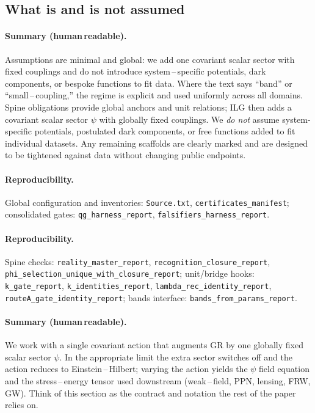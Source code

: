 \documentclass[aps,prd,twocolumn,superscriptaddress,nofootinbib,floatfix,longbibliography]{revtex4-2}
\begin{document}
\subsection{What is and is not assumed}
\paragraph*{Summary (human\,readable).}
Assumptions are minimal and global: we add one covariant scalar sector with fixed couplings and do not introduce system\,–\,specific potentials, dark components, or bespoke functions to fit data. Where the text says “band” or “small\,–\,coupling,” the regime is explicit and used uniformly across all domains.
Spine obligations provide global anchors and unit relations; ILG then adds a covariant scalar sector $\psi$ with globally fixed couplings. We \emph{do not} assume system-specific potentials, postulated dark components, or free functions added to fit individual datasets. Any remaining scaffolds are clearly marked and are designed to be tightened against data without changing public endpoints.
\paragraph*{Reproducibility.}
Global configuration and inventories: \texttt{Source.txt}, \texttt{certificates\_manifest}; consolidated gates: \texttt{qg\_harness\_report}, \texttt{falsifiers\_harness\_report}.

\paragraph*{Reproducibility.}
Spine checks: \texttt{reality\_master\_report}, \texttt{recognition\_closure\_report}, \texttt{phi\_selection\_unique\_with\_closure\_report}; unit/bridge hooks: \texttt{k\_gate\_report}, \texttt{k\_identities\_report}, \texttt{lambda\_rec\_identity\_report}, \texttt{routeA\_gate\_identity\_report}; bands interface: \texttt{bands\_from\_params\_report}.
%
%
\paragraph*{Summary (human\,readable).}
We work with a single covariant action that augments GR by one globally fixed scalar sector $\psi$. In the appropriate limit the extra sector switches off and the action reduces to Einstein\,–\,Hilbert; varying the action yields the $\psi$ field equation and the stress\,–\,energy tensor used downstream (weak\,–\,field, PPN, lensing, FRW, GW). Think of this section as the contract and notation the rest of the paper relies on.
\end{document}
